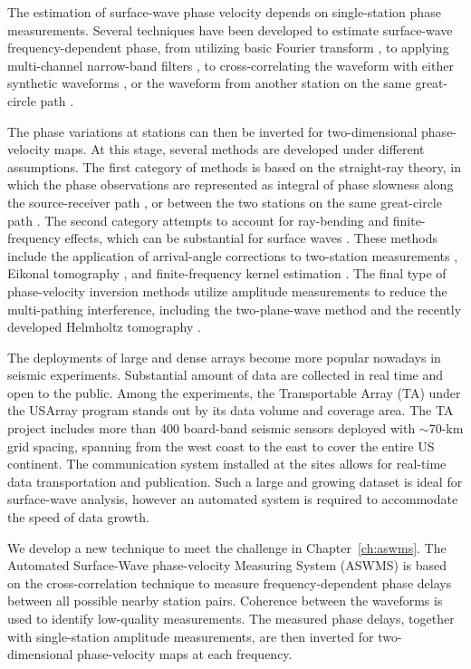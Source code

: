 \documentclass[12pt,oneside]{book}
\begin{document}
The estimation of surface-wave phase velocity depends on single-station phase measurements. Several techniques have been developed to estimate surface-wave frequency-dependent phase, from utilizing basic Fourier transform \citep{Forsyth:2005id}, to applying multi-channel narrow-band filters \citep[e.g.][]{Levshin:1992ve}, to cross-correlating the waveform with either synthetic waveforms \citep[e.g.][]{Gee:1992ww, Ekstrom:1997ff}, or the waveform from another station on the same great-circle path \citep[e.g.][]{Landisman:1969gt}.

The phase variations at stations can then be inverted for two-dimensional phase-velocity maps. At this stage, several methods are developed under different assumptions. The first category of methods is based on the straight-ray theory, in which the phase observations are represented as integral of phase slowness along the source-receiver path \citep[e.g.][]{Nettles:2008ha}, or between the two stations on the same great-circle path \citep[e.g.][]{Yao:2005ha,foster:2014kna}. The second category attempts to account for ray-bending and finite-frequency effects, which can be substantial for surface waves \citep[e.g.][]{Evernden:1954ui,Zhou:2005fk}. These methods include the application of arrival-angle corrections to two-station measurements \citep{foster:2014kna}, Eikonal tomography \citep{Lin:2009fx}, and finite-frequency kernel estimation \citep{Zhou:2006gna}. The final type of phase-velocity inversion methods utilize amplitude measurements to reduce the multi-pathing interference, including the two-plane-wave method \citep{Forsyth:2005id} and the recently developed Helmholtz tomography \citep{Lin:2011fw}.

The deployments of large and dense arrays become more popular  nowadays in seismic experiments. Substantial amount of data are collected in real time and open to the public. 
Among the experiments, the Transportable Array (TA) under the USArray program stands out by its data volume and coverage area. The TA project includes more than 400 board-band seismic sensors deployed with $\sim$70-km grid spacing, spanning from the west coast to the east to cover the entire US continent. The communication system installed at the sites allows for real-time data transportation and publication. Such a large and growing dataset is ideal for surface-wave analysis, however an automated system is required to accommodate the speed of data growth.

We develop a new technique to meet the challenge in Chapter~\ref{ch:aswms}. The Automated Surface-Wave phase-velocity Measuring System (ASWMS) is based on the cross-correlation technique to measure frequency-dependent phase delays between all possible nearby station pairs. 
Coherence between the waveforms is used to identify low-quality measurements.  
The measured phase delays, together with single-station amplitude measurements, are then inverted for two-dimensional phase-velocity maps at each frequency.
\end{document}
